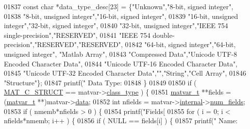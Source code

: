 \begin{DoxyCode}
{{{{{{{{{{{{{{{{{{{{{{{{{{{{{{{{{{{01837         \textcolor{keyword}{const} \textcolor{keywordtype}{char} *data\_type\_desc[23] = \{\textcolor{stringliteral}{"Unknown"},\textcolor{stringliteral}{"8-bit, signed integer"},
01838            \textcolor{stringliteral}{"8-bit, unsigned integer"},\textcolor{stringliteral}{"16-bit, signed integer"},
01839            \textcolor{stringliteral}{"16-bit, unsigned integer"},\textcolor{stringliteral}{"32-bit, signed integer"},
01840            \textcolor{stringliteral}{"32-bit, unsigned integer"},\textcolor{stringliteral}{"IEEE 754 single-precision"},\textcolor{stringliteral}{"RESERVED"},
01841            \textcolor{stringliteral}{"IEEE 754 double-precision"},\textcolor{stringliteral}{"RESERVED"},\textcolor{stringliteral}{"RESERVED"},
01842            \textcolor{stringliteral}{"64-bit, signed integer"},\textcolor{stringliteral}{"64-bit, unsigned integer"}, \textcolor{stringliteral}{"Matlab Array"},
01843            \textcolor{stringliteral}{"Compressed Data"},\textcolor{stringliteral}{"Unicode UTF-8 Encoded Character Data"},
01844            \textcolor{stringliteral}{"Unicode UTF-16 Encoded Character Data"},
01845            \textcolor{stringliteral}{"Unicode UTF-32 Encoded Character Data"},\textcolor{stringliteral}{""},\textcolor{stringliteral}{"String"},\textcolor{stringliteral}{"Cell Array"},
01846            \textcolor{stringliteral}{"Structure"}\};
01847         printf(\textcolor{stringliteral}{" Data Type: %
01848     \}
01849 
01850     \textcolor{keywordflow}{if} ( \hyperlink{group___m_a_t_ggad4d60ae7b709fc81bfd744fb4c857c40acb467c7749c80902b798134c729bb521}{MAT\_C\_STRUCT} == matvar->\hyperlink{group___m_a_t_aff13035bf3265dd7d9425e5d40c839d4}{class\_type} ) \{
01851         \hyperlink{group___m_a_t_structmatvar__t}{matvar\_t} **fields = (\hyperlink{group___m_a_t_structmatvar__t}{matvar\_t} **)matvar->\hyperlink{group___m_a_t_a5672978efa230bbdecdf38ede781f7fa}{data};
01852         \textcolor{keywordtype}{int} nfields = matvar->\hyperlink{group___m_a_t_a6e97e3ed9f40c49322c18561c2a94e92}{internal}->\hyperlink{structmatvar__internal_a93fc447484f455eddf9334f2e9e411c2}{num\_fields};
01853         if ( nmemb*nfields > 0 ) \{
01854             printf(\textcolor{stringliteral}{"Fields[%
01855             \textcolor{keywordflow}{for} ( i = 0; i < nfields*nmemb; i++ ) \{
01856                 \textcolor{keywordflow}{if} ( NULL == fields[i] ) \{
01857                     printf(\textcolor{stringliteral}{"      Name: %
}}}}}}}}}}}}}}}}}}}}}}}}}}}}}}}}}}}}}}
\end{DoxyCode}
